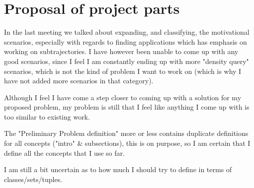 \section{Proposal of project parts}

% 

In the last meeting we talked about expanding, and classifying, the motivational scenarios, especially with regards to 
finding applications which has emphasis on working on subtrajectories. I have however been unable to come up with any good
scenarios, since I feel I am constantly ending up with more "density query" scenarios, which is not the kind of problem I want
to work on (which is why I have not added more scenarios in that category). 

Although I feel I have come a step closer to coming up with a solution for my proposed problem, my problem is still that I
feel like anything I come up with is too similar to existing work.

The "Preliminary Problem definition" more or less contains duplicate definitions for all concepts ("intro" \& subsections), this is on purpose, so I am
certain that I define all the concepts that I use so far. 

I am still a bit uncertain as to how much I should try to define in terms of classes/sets/tuples.



